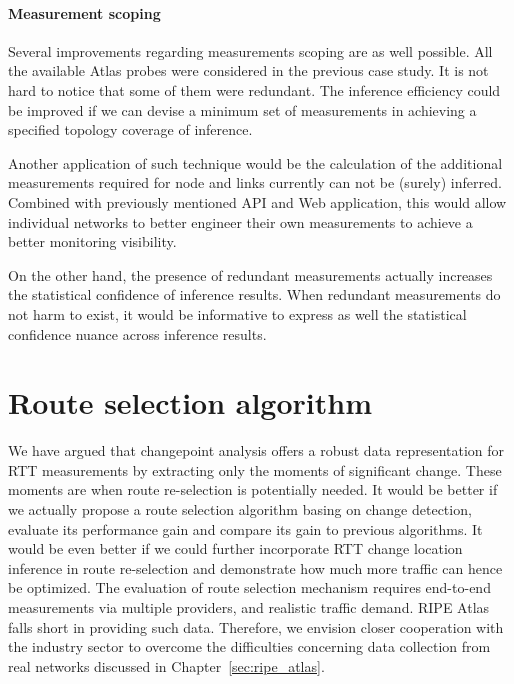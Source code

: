 \paragraph*{Measurement scoping} Several improvements regarding measurements scoping are as well possible. All the available Atlas probes were considered in the previous case study. It is not hard to notice that some of them were redundant.
The inference efficiency could be improved if we can devise a minimum set of measurements in achieving a specified topology coverage of inference.

Another application of such technique would be the calculation of the additional measurements required for node and links currently can not be (surely) inferred. Combined with previously mentioned API and Web application, this would allow individual networks to better engineer their own measurements to achieve a better monitoring visibility. 

On the other hand, the presence of redundant measurements actually increases the statistical confidence of inference results. When redundant measurements do not harm to exist, it would be informative to express as well the statistical confidence nuance across inference results.

\section{Route selection algorithm}
We have argued that changepoint analysis offers a robust data representation for RTT measurements by extracting only the moments of significant change. These moments are when route re-selection is potentially needed. It would be better if we actually propose a route selection algorithm basing on change detection, evaluate its performance gain and compare its gain to previous algorithms.
It would be even better if we could further incorporate RTT change location inference in route re-selection and demonstrate how much more traffic can hence be optimized.
The evaluation of route selection mechanism requires end-to-end measurements via multiple providers, and realistic traffic demand.
RIPE Atlas falls short in providing such data.
Therefore, we envision closer cooperation with the industry sector to overcome the difficulties concerning data collection from real networks discussed in Chapter~\ref{sec:ripe_atlas}.
 